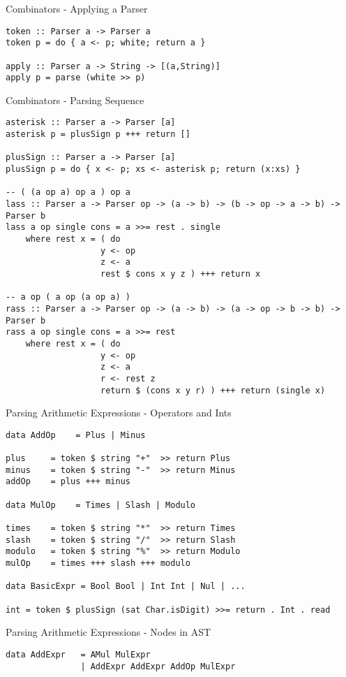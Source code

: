 \documentclass[12pt]{beamer}
\newcommand{\codesize}{\fontsize{7.7}{7.7}}
\begin{document}
\begin{spacing}{1.3}
\begin{frame}[fragile=singleslide]{Combinators - Applying a Parser}
\begin{verbatim}
token :: Parser a -> Parser a
token p = do { a <- p; white; return a }

apply :: Parser a -> String -> [(a,String)]
apply p = parse (white >> p)
\end{verbatim}
\end{frame}

\begin{frame}[fragile=singleslide]{Combinators - Parsing Sequence}
\begin{verbatim}
asterisk :: Parser a -> Parser [a]
asterisk p = plusSign p +++ return []

plusSign :: Parser a -> Parser [a]
plusSign p = do { x <- p; xs <- asterisk p; return (x:xs) }

-- ( (a op a) op a ) op a
lass :: Parser a -> Parser op -> (a -> b) -> (b -> op -> a -> b) -> Parser b
lass a op single cons = a >>= rest . single
    where rest x = ( do
                   y <- op
                   z <- a
                   rest $ cons x y z ) +++ return x

-- a op ( a op (a op a) )
rass :: Parser a -> Parser op -> (a -> b) -> (a -> op -> b -> b) -> Parser b
rass a op single cons = a >>= rest
    where rest x = ( do
                   y <- op
                   z <- a
                   r <- rest z
                   return $ (cons x y r) ) +++ return (single x)
\end{verbatim}
\end{frame}

\begin{frame}[fragile=singleslide]{Parsing Arithmetic Expressions - Operators and Ints}
\begin{verbatim}
data AddOp    = Plus | Minus

plus     = token $ string "+"  >> return Plus
minus    = token $ string "-"  >> return Minus
addOp    = plus +++ minus

data MulOp    = Times | Slash | Modulo

times    = token $ string "*"  >> return Times
slash    = token $ string "/"  >> return Slash
modulo   = token $ string "%"  >> return Modulo
mulOp    = times +++ slash +++ modulo

data BasicExpr = Bool Bool | Int Int | Nul | ...

int = token $ plusSign (sat Char.isDigit) >>= return . Int . read
\end{verbatim}
\end{frame}

\begin{frame}[fragile=singleslide]{Parsing Arithmetic Expressions - Nodes in AST}
\begin{verbatim}
data AddExpr   = AMul MulExpr
               | AddExpr AddExpr AddOp MulExpr


\end{verbatim}
\end{frame}
\end{spacing}
\end{document}
